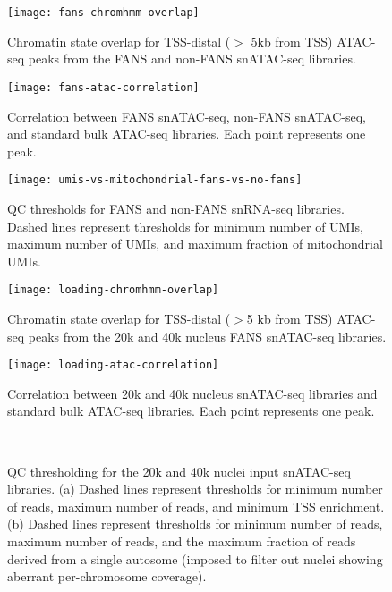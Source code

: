 \documentclass{article}
\begin{document}
\renewcommand{\thefigure}{\textbf{S\arabic{figure}. }}
\setcounter{figure}{0}

\begin{figure}
\texttt{[image: fans-chromhmm-overlap]}
	\caption{Chromatin state overlap for TSS-distal ($>$ 5kb from TSS) ATAC-seq peaks from the FANS and non-FANS snATAC-seq libraries.}
\end{figure}

\begin{figure}
\texttt{[image: fans-atac-correlation]}
\caption{Correlation between FANS snATAC-seq, non-FANS snATAC-seq, and standard bulk ATAC-seq libraries. Each point represents one peak.}
\end{figure}

\begin{figure}
\texttt{[image: umis-vs-mitochondrial-fans-vs-no-fans]}
\caption{QC thresholds for FANS and non-FANS snRNA-seq libraries. Dashed lines represent thresholds for minimum number of UMIs, maximum number of UMIs, and maximum fraction of mitochondrial UMIs.}
\end{figure}

\begin{figure}
\texttt{[image: loading-chromhmm-overlap]}
	\caption{Chromatin state overlap for TSS-distal ($>$5 kb from TSS) ATAC-seq peaks from the 20k and 40k nucleus FANS snATAC-seq libraries.}
\end{figure}

\begin{figure}
\texttt{[image: loading-atac-correlation]}
\caption{Correlation between 20k and 40k nucleus snATAC-seq libraries and standard bulk ATAC-seq libraries. Each point represents one peak.}
\end{figure}

\begin{figure}
	\\
	\caption{QC thresholding for the 20k and 40k nuclei input snATAC-seq libraries. (a) Dashed lines represent thresholds for minimum number of reads, maximum number of reads, and minimum TSS enrichment. (b) Dashed lines represent thresholds for minimum number of reads, maximum number of reads, and the maximum fraction of reads derived from a single autosome (imposed to filter out nuclei showing aberrant per-chromosome coverage).}
\end{figure} 
\end{document}
